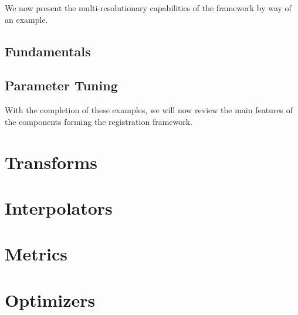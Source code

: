 We now present the multi-resolutionary capabilities of the framework by
way of an example.

\subsection{Fundamentals}
\ifitkFullVersion

\fi

\subsection{Parameter Tuning}
\ifitkFullVersion

\fi

With the completion of these examples, we will now review the main
features of the components forming the registration framework.


\clearpage

\section{Transforms}
\label{sec:Transforms}
\ifitkFullVersion

\fi



\clearpage

\section{Interpolators}
\label{sec:Interpolators}
\ifitkFullVersion

\fi

\clearpage

\section{Metrics}
\label{sec:Metrics}
\ifitkFullVersion

\fi

\clearpage

\section{Optimizers}
\label{sec:Optimizers}
\ifitkFullVersion

\fi



